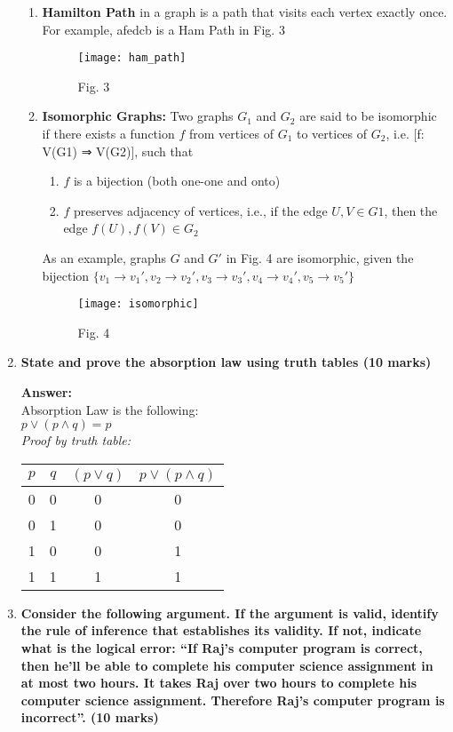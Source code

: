 \documentclass[a4paper]{article}
\begin{document}
\begin{enumerate}
\begin{enumerate}
\item \textbf{Hamilton Path} in a graph is a path that visits each vertex exactly once. For example, afedcb is a Ham Path in Fig. 3
\begin{figure}[H]
\centering
\texttt{[image: ham\_path]}
\caption*{Fig. 3}
\end{figure}


\item \textbf{Isomorphic Graphs: } Two graphs $G_1$ and $G_2$ are said to be isomorphic if there exists a function $f$ from vertices of $G_1$ to vertices of $G_2$, i.e. [f: V(G1) ⇒ V(G2)], such that\\
\begin{enumerate}
\item $f$ is a bijection (both one-one and onto)
\item $f$ preserves adjacency of vertices, i.e., if the edge ${U, V} \in G1$, then the edge ${f(U), f(V)} \in G_2$
\end{enumerate}    
As an example, graphs $G$ and $G'$ in Fig. 4 are isomorphic, given the bijection $\{v_1 \rightarrow v_1', v_2 \rightarrow v_2', v_3 \rightarrow v_3', v_4 \rightarrow v_4', v_5 \rightarrow v_5'\}$

\begin{figure}[H]
\centering
\texttt{[image: isomorphic]}
\caption*{Fig. 4}
\end{figure}

\end{enumerate}
    \item \textbf{State and prove the absorption law using truth tables (10 marks)}
    
\textbf{Answer:}\\
Absorption Law is the following:\\
$p \lor (p \land q) = p$\\

\textit{Proof by truth table:}

\begin{tabular}{|c|c|c|c|}
\hline
$p$ & $q$ & $(p \lor q)$ & $p \lor (p \land q)$\\
\hline
0 & 0 & 0 & 0\\
\hline
0 & 1 & 0 & 0\\
\hline
1 & 0 & 0 & 1\\
\hline
1 & 1 & 1 & 1\\
\hline
\end{tabular}

    \item \textbf{Consider the following argument. If the argument is valid, identify the rule of inference that establishes its validity. If not, indicate what is the logical error: ``If Raj's computer program is correct, then he'll be able to complete his computer science assignment in at most two hours. It takes Raj over two hours to complete his computer science assignment. Therefore Raj's computer program is incorrect''. (10 marks)\\}


\end{enumerate}
\end{document}
